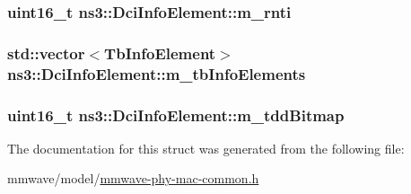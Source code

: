 \subsubsection[{\texorpdfstring{m\+\_\+rnti}{m_rnti}}]{\setlength{\rightskip}{0pt plus 5cm}uint16\+\_\+t ns3\+::\+Dci\+Info\+Element\+::m\+\_\+rnti}\hypertarget{structns3_1_1DciInfoElement_a297dddfac0c3a31d69fefd3a970c113e}{}\label{structns3_1_1DciInfoElement_a297dddfac0c3a31d69fefd3a970c113e}
\subsubsection[{\texorpdfstring{m\+\_\+tb\+Info\+Elements}{m_tbInfoElements}}]{\setlength{\rightskip}{0pt plus 5cm}std\+::vector$<${\bf Tb\+Info\+Element}$>$ ns3\+::\+Dci\+Info\+Element\+::m\+\_\+tb\+Info\+Elements}\hypertarget{structns3_1_1DciInfoElement_a452785081ea9e2194fb70f6b89c81b27}{}\label{structns3_1_1DciInfoElement_a452785081ea9e2194fb70f6b89c81b27}
\subsubsection[{\texorpdfstring{m\+\_\+tdd\+Bitmap}{m_tddBitmap}}]{\setlength{\rightskip}{0pt plus 5cm}uint16\+\_\+t ns3\+::\+Dci\+Info\+Element\+::m\+\_\+tdd\+Bitmap}\hypertarget{structns3_1_1DciInfoElement_afdec7f1549f30be0d4be704a30f4e156}{}\label{structns3_1_1DciInfoElement_afdec7f1549f30be0d4be704a30f4e156}


The documentation for this struct was generated from the following file\+:\begin{DoxyCompactItemize}
\item 
mmwave/model/\hyperlink{mmwave-phy-mac-common_8h}{mmwave-\/phy-\/mac-\/common.\+h}\end{DoxyCompactItemize}
